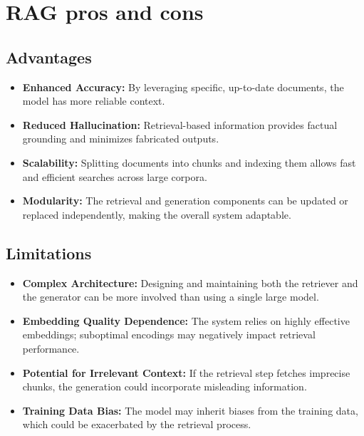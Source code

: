 \documentclass[conference]{IEEEtran}
\begin{document}
\section{RAG pros and cons}

\subsection{Advantages}
\begin{itemize}
    \item \textbf{Enhanced Accuracy:} By leveraging specific, up-to-date documents, the model has more reliable context.
    \item \textbf{Reduced Hallucination:} Retrieval-based information provides
          factual grounding and minimizes fabricated outputs.
    \item \textbf{Scalability:} Splitting documents into chunks and indexing them allows fast and efficient searches across large corpora.
    \item \textbf{Modularity:} The retrieval and generation components can be updated or replaced independently, making the overall system adaptable.
\end{itemize}

\subsection{Limitations}
\begin{itemize}
    \item \textbf{Complex Architecture:} Designing and maintaining both the retriever and the generator can be more involved than using a single large model.
    \item \textbf{Embedding Quality Dependence:} The system relies on highly effective embeddings; suboptimal encodings may negatively impact retrieval performance.
    \item \textbf{Potential for Irrelevant Context:} If the retrieval step fetches imprecise chunks, the generation could incorporate misleading information.
    \item \textbf{Training Data Bias:} The model may inherit biases from the training data, which could be exacerbated by the retrieval process.
\end{itemize}
\end{document}
